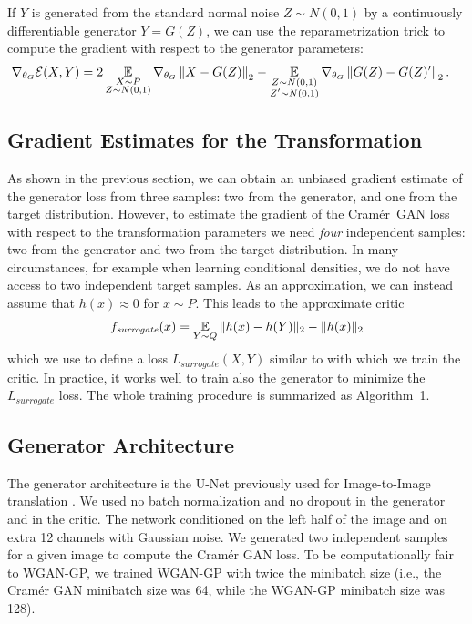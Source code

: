 \documentclass{article}
\def \cramer {Cram{\'e}r}
\begin{document}
If $Y$ is generated from the standard normal noise $Z \sim N(0, 1)$
by a continuously differentiable generator $Y = G(Z)$, we can use
the reparametrization trick \citep{kingma2013auto}
to compute the gradient with respect to the generator parameters:
\begin{align*}
  \grad_{\theta_G} \cE(X, Y) &= 2 \expect_{\substack{X \sim P \\ Z \sim N(0, 1)}} \grad_{\theta_G} \norm{X - G(Z)}_2
    - \expect_{\substack{Z \sim N(0, 1) \\ Z' \sim N(0, 1)}} \grad_{\theta_G} \norm{G(Z) - G(Z)'}_2 .
\end{align*}

\subsection{Gradient Estimates for the Transformation}

As shown in the previous section, we can obtain an unbiased gradient estimate of the generator loss  from three samples: two from the generator, and one from the target distribution. However, to estimate the gradient of the \cramer~GAN loss with respect to the transformation parameters we need \emph{four} independent samples: two from the generator and two from the target distribution. In many circumstances, for example when learning conditional densities, we do not have access to two independent target samples. As an approximation, we can instead assume that $h(x) \approx 0$ for $x \sim P$. This leads to the approximate critic
\begin{align*}
  f_\mathit{surrogate}(x) = \expect_{Y \sim Q} \|h(x) - h(Y)\|_2 - \|h(x)\|_2
\end{align*}
which we use to define a loss $L_\mathit{surrogate}(X, Y)$ similar to  with which we train the critic. In practice, it works well to train also the generator
to minimize the $L_\mathit{surrogate}$ loss.
The whole training procedure is summarized as Algorithm~1.

\subsection{Generator Architecture}
The generator architecture is the U-Net \citep{ronneberger2015u} previously used for Image-to-Image translation \citep{isola2016image}.
We used no batch normalization and no dropout in the generator and in the critic. The network conditioned on the left half of the image and on extra 12 channels with Gaussian noise.
We generated two independent samples for a given image to compute the Cram\'er GAN loss. To be computationally fair to WGAN-GP, we trained WGAN-GP with twice the minibatch size (i.e., the Cram\'er GAN minibatch size was 64, while the WGAN-GP minibatch size was 128).
\end{document}
